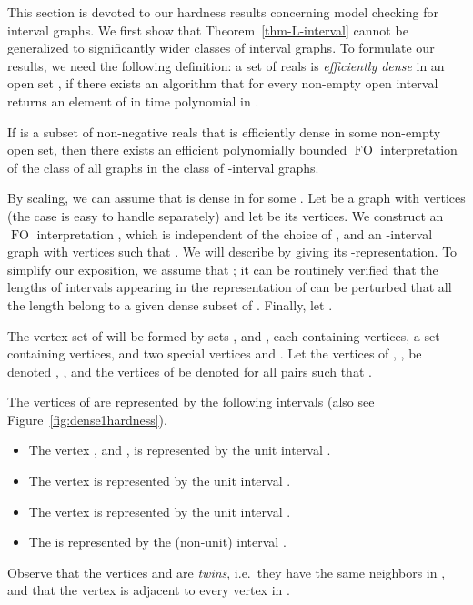 \documentclass{CSML}
\newcommand{\FO}{\ensuremath{\operatorname{FO}}\xspace}
\theoremstyle{plain}\newtheorem{claim}[thm]{Claim}
\begin{document}
This section is devoted to our hardness results concerning model checking for interval graphs.
We first show that Theorem~\ref{thm-L-interval} cannot be generalized to significantly wider classes of interval graphs.
To formulate our results, we need the following definition:
a set  of reals is {\em efficiently dense} in an open set ,
if there exists an algorithm that for every non-empty open interval  returns an element of 
in time polynomial in .

\begin{lem}
\label{lem:1epsFO}
If  is a subset of non-negative reals that is efficiently dense in some non-empty open set,
then there exists an efficient polynomially bounded \FO interpretation of the class of all graphs
in the class of -interval graphs.
\end{lem}
\proof
By scaling, we can assume that  is dense in  for some .
Let  be a graph with  vertices (the case  is easy to handle separately) and let  be its vertices.
We construct an \FO interpretation , which is independent of the choice of , and
an -interval graph  with  vertices such that .
We will describe  by giving its -representation.
To simplify our exposition, we assume that ;
it can be routinely verified that the lengths of intervals appearing in the representation of  can be perturbed that
all the length belong to a given dense subset of .
Finally, let .

The vertex set of  will be formed by sets ,  and , each containing  vertices,
a set  containing  vertices, and two special vertices  and .
Let the vertices of , , be denoted , , and
the vertices of  be denoted  for all pairs  such that .

The vertices of  are represented by the following intervals (also see Figure~\ref{fig:dense1hardness}).
\begin{itemize}
\item The vertex ,  and ,
      is represented by the unit interval .
\item The vertex  is represented by the unit interval .
\item The vertex  is represented by the unit interval .
\item The  is represented by the (non-unit) interval .
\end{itemize}
Observe that the vertices  and  are {\em twins}, i.e.~they have the same neighbors in , and
that the vertex  is adjacent to every vertex in .
\end{document}
